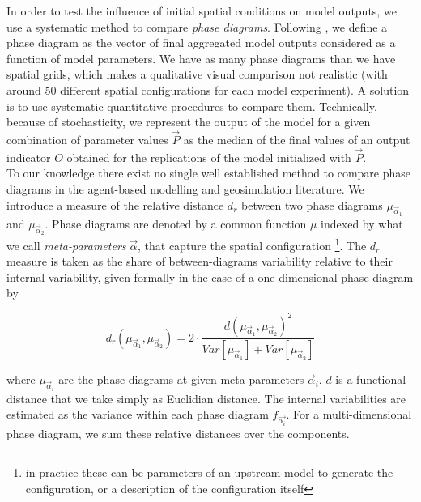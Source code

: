 \documentclass[preprint,5p,times,twocolumn,authoryear]{elsarticle}
\begin{document}
In order to test the influence of initial spatial conditions on model outputs, we use a systematic method to compare \emph{phase diagrams}. Following \citet{Gauvinetal2009}, we define a phase diagram as the vector of final aggregated model outputs considered as a function of model parameters. We have as many phase diagrams than we have spatial grids, which makes a qualitative visual comparison not realistic (with around 50 different spatial configurations for each model experiment). A solution is to use systematic quantitative procedures to compare them.
Technically, because of stochasticity, we represent the output of the model for a given combination of parameter values $\vec{P}$ as the median of the final values of an output indicator $O$ obtained for the replications of the model initialized with $\vec{P}$.\\

To our knowledge there exist no single well established method to compare phase diagrams in the agent-based modelling and geosimulation literature. We introduce a measure of the relative distance $d_r$ between two phase diagrams $\mu_{\vec{\alpha}_1}$ and $\mu_{\vec{\alpha}_2}$. Phase diagrams are denoted by a common function $\mu$ indexed by what we call \emph{meta-parameters} $\vec{\alpha}$, that capture the spatial configuration \footnote{in practice these can be parameters of an upstream model to generate the configuration, or a description of the configuration itself}. The $d_r$ measure is taken as the share of between-diagrams variability relative to their internal variability, given formally in the case of a one-dimensional phase diagram by


\begin{equation}\label{eq:phase-distance}
d_r\left(\mu_{\vec{\alpha}_1},\mu_{\vec{\alpha}_2}\right) = 2 \cdot \frac{d(\mu_{\vec{\alpha}_1},\mu_{\vec{\alpha}_2})^2}{Var\left[\mu_{\vec{\alpha}_1}\right] + Var\left[\mu_{\vec{\alpha}_2}\right]}
\end{equation}

where $\mu_{\vec{\alpha}_i}$ are the phase diagrams at given meta-parameters $\vec{\alpha}_i$. $d$ is a functional distance that we take simply as Euclidian distance. The internal variabilities are estimated as the variance within each phase diagram $f_{\vec{\alpha_i}}$. For a multi-dimensional phase diagram, we sum these relative distances over the components. 
\end{document}
